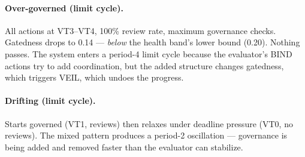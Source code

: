 \documentclass[sigconf,nonacm]{acmart}
\begin{document}
\paragraph{Over-governed (limit cycle).}
All actions at VT3--VT4, 100\% review rate, maximum governance checks.
Gatedness drops to 0.14 --- \emph{below} the health band's lower bound
(0.20). Nothing passes. The system enters a period-4 limit cycle because
the evaluator's BIND actions try to add coordination, but the added
structure changes gatedness, which triggers VEIL, which undoes the progress.

\paragraph{Drifting (limit cycle).}
Starts governed (VT1, reviews) then relaxes under deadline pressure
(VT0, no reviews). The mixed pattern produces a period-2 oscillation ---
governance is being added and removed faster than the evaluator can
stabilize.
\end{document}
